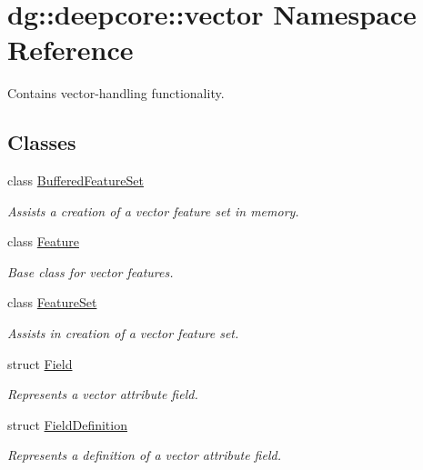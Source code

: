 \hypertarget{namespacedg_1_1deepcore_1_1vector}{}\section{dg\+:\+:deepcore\+:\+:vector Namespace Reference}
\label{namespacedg_1_1deepcore_1_1vector}


Contains vector-\/handling functionality.  


\subsection*{Classes}
\begin{DoxyCompactItemize}
\item 
class \hyperlink{classdg_1_1deepcore_1_1vector_1_1_buffered_feature_set}{Buffered\+Feature\+Set}
\begin{DoxyCompactList}\small\item\em Assists a creation of a vector feature set in memory. \end{DoxyCompactList}\item 
class \hyperlink{classdg_1_1deepcore_1_1vector_1_1_feature}{Feature}
\begin{DoxyCompactList}\small\item\em Base class for vector features. \end{DoxyCompactList}\item 
class \hyperlink{classdg_1_1deepcore_1_1vector_1_1_feature_set}{Feature\+Set}
\begin{DoxyCompactList}\small\item\em Assists in creation of a vector feature set. \end{DoxyCompactList}\item 
struct \hyperlink{structdg_1_1deepcore_1_1vector_1_1_field}{Field}
\begin{DoxyCompactList}\small\item\em Represents a vector attribute field. \end{DoxyCompactList}\item 
struct \hyperlink{structdg_1_1deepcore_1_1vector_1_1_field_definition}{Field\+Definition}
\begin{DoxyCompactList}\small\item\em Represents a definition of a vector attribute field. \end{DoxyCompactList}\end{DoxyCompactItemize}
